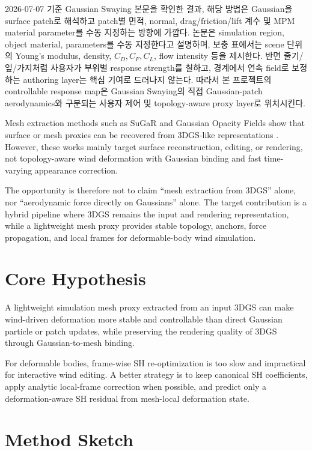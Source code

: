 \documentclass[11pt]{article}
\begin{document}
2026-07-07 기준 Gaussian Swaying 본문을 확인한 결과, 해당 방법은 Gaussian을 surface patch로 해석하고 patch별 면적, normal, drag/friction/lift 계수 및 MPM material parameter를 수동 지정하는 방향에 가깝다. 논문은 simulation region, object material, parameters를 수동 지정한다고 설명하며, 보충 표에서는 scene 단위의 Young's modulus, density, \(C_D,C_F,C_L\), flow intensity 등을 제시한다. 반면 줄기/잎/가지처럼 사용자가 부위별 response strength를 칠하고, 경계에서 연속 field로 보정하는 authoring layer는 핵심 기여로 드러나지 않는다. 따라서 본 프로젝트의 controllable response map은 Gaussian Swaying의 직접 Gaussian-patch aerodynamics와 구분되는 사용자 제어 및 topology-aware proxy layer로 위치시킨다.

Mesh extraction methods such as SuGaR and Gaussian Opacity Fields show that surface or mesh proxies can be recovered from 3DGS-like representations \cite{guedon2024sugar,yu2024gof}. However, these works mainly target surface reconstruction, editing, or rendering, not topology-aware wind deformation with Gaussian binding and fast time-varying appearance correction.

The opportunity is therefore not to claim ``mesh extraction from 3DGS'' alone, nor ``aerodynamic force directly on Gaussians'' alone. The target contribution is a hybrid pipeline where 3DGS remains the input and rendering representation, while a lightweight mesh proxy provides stable topology, anchors, force propagation, and local frames for deformable-body wind simulation.

\section{Core Hypothesis}

A lightweight simulation mesh proxy extracted from an input 3DGS can make wind-driven deformation more stable and controllable than direct Gaussian particle or patch updates, while preserving the rendering quality of 3DGS through Gaussian-to-mesh binding.

For deformable bodies, frame-wise SH re-optimization is too slow and impractical for interactive wind editing. A better strategy is to keep canonical SH coefficients, apply analytic local-frame correction when possible, and predict only a deformation-aware SH residual from mesh-local deformation state.

\section{Method Sketch}
\end{document}
